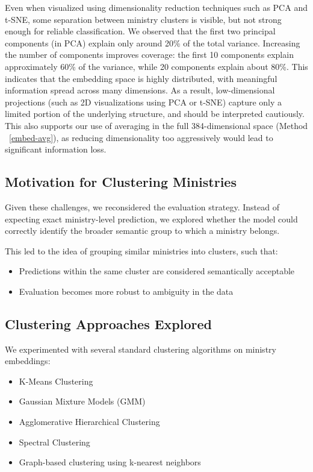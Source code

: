 \documentclass{report}
\begin{document}
\begin{enumerate}
        Even when visualized using dimensionality reduction techniques such as PCA and t-SNE, some separation between ministry clusters is visible, but not strong enough for reliable classification. We observed that the first two principal components (in PCA) explain only around 20\% of the total variance. Increasing the number of components improves coverage: the first 10 components explain approximately 60\% of the variance, while 20 components explain about 80\%. This indicates that the embedding space is highly distributed, with meaningful information spread across many dimensions. As a result, low-dimensional projections (such as 2D visualizations using PCA or t-SNE) capture only a limited portion of the underlying structure, and should be interpreted cautiously. This also supports our use of averaging in the full 384-dimensional space (Method ~\ref{embed-avg}), as reducing dimensionality too aggressively would lead to significant information loss.
\end{enumerate}

\subsection{Motivation for Clustering Ministries}
Given these challenges, we reconsidered the evaluation strategy. Instead of expecting exact ministry-level prediction, we explored whether the model could correctly identify the broader semantic group to which a ministry belongs.

This led to the idea of grouping similar ministries into clusters, such that:
\begin{itemize}
    \item Predictions within the same cluster are considered semantically acceptable
    \item Evaluation becomes more robust to ambiguity in the data
\end{itemize}

\subsection{Clustering Approaches Explored}

We experimented with several standard clustering algorithms on ministry embeddings:

\begin{itemize}[leftmargin=+.5in]
    \item K-Means Clustering
    \item Gaussian Mixture Models (GMM)
    \item Agglomerative Hierarchical Clustering
    \item Spectral Clustering
    \item Graph-based clustering using k-nearest neighbors
\end{itemize}
\end{document}
